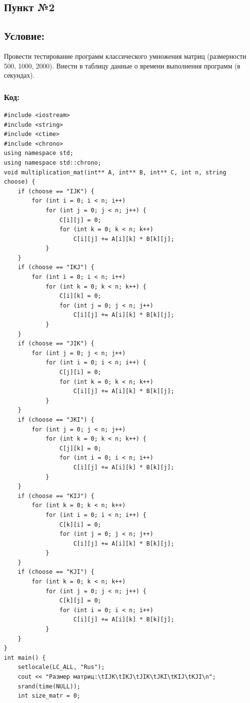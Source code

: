 \documentclass[a4paper]{article}
\begin{document}
\subsection{Пункт №2}
\subsection{Условие:}
Провести тестирование программ классического умножения матриц (размерности 500, 1000, 2000). Внести в таблицу данные о времени выполнения программ (в секундах).
\subsubsection{Код:}\scriptsize
\begin{verbatim}
#include <iostream>
#include <string>
#include <ctime>
#include <chrono>
using namespace std;
using namespace std::chrono;
void multiplication_mat(int** A, int** B, int** C, int n, string choose) {
    if (choose == "IJK") {
        for (int i = 0; i < n; i++)
            for (int j = 0; j < n; j++) {
                C[i][j] = 0;
                for (int k = 0; k < n; k++)
                    C[i][j] += A[i][k] * B[k][j];
            }
    }
    if (choose == "IKJ") {
        for (int i = 0; i < n; i++)
            for (int k = 0; k < n; k++) {
                C[i][k] = 0;
                for (int j = 0; j < n; j++)
                    C[i][j] += A[i][k] * B[k][j];
            }
    }
    if (choose == "JIK") {
        for (int j = 0; j < n; j++)
            for (int i = 0; i < n; i++) {
                C[j][i] = 0;
                for (int k = 0; k < n; k++)
                    C[i][j] += A[i][k] * B[k][j];
            }
    }
    if (choose == "JKI") {
        for (int j = 0; j < n; j++)
            for (int k = 0; k < n; k++) {
                C[j][k] = 0;
                for (int i = 0; i < n; i++)
                    C[i][j] += A[i][k] * B[k][j];
            }
    }
    if (choose == "KIJ") {
        for (int k = 0; k < n; k++)
            for (int i = 0; i < n; i++) {
                C[k][i] = 0;
                for (int j = 0; j < n; j++)
                    C[i][j] += A[i][k] * B[k][j];
            }
    }
    if (choose == "KJI") {
        for (int k = 0; k < n; k++)
            for (int j = 0; j < n; j++) {
                C[k][j] = 0;
                for (int i = 0; i < n; i++)
                    C[i][j] += A[i][k] * B[k][j];
            }
    }
}
int main() {
    setlocale(LC_ALL, "Rus");
    cout << "Размер матриц:\tIJK\tIKJ\tJIK\tJKI\tKIJ\tKJI\n";
    srand(time(NULL));
    int size_matr = 0;

\end{verbatim}
\end{document}
